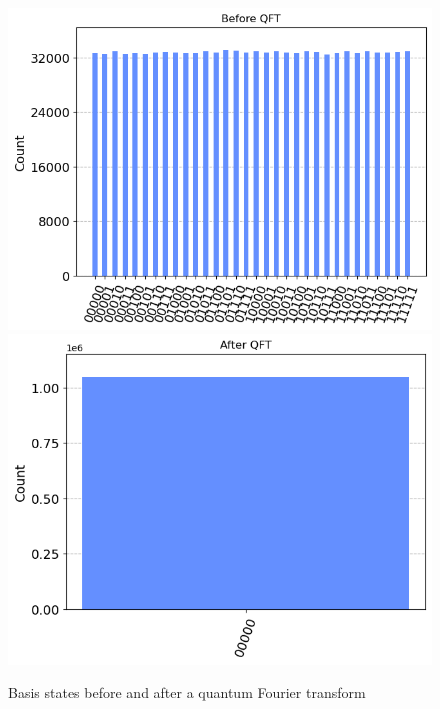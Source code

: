 \documentclass{article}
\begin{document}
\begin{figure}[!h]
\centering


\includegraphics[scale=0.3]{code_snippets/qft1.png}
\includegraphics[scale=0.3]{code_snippets/qft2.png}



\caption{Basis states before and after a quantum Fourier transform}

\end{figure}
\end{document}
